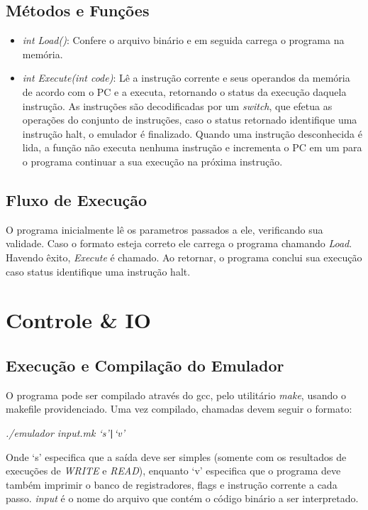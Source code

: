 \documentclass[12pt, a4paper]{article}
\begin{document}
\subsection{Métodos e Funções}

\begin{itemize}
\item \emph{int Load()}: Confere o arquivo binário e em seguida carrega o programa na memória. 
\item \emph{int Execute(int code)}: Lê a instrução corrente e seus operandos da memória de acordo com o PC e a executa, retornando o status da execução daquela instrução. As instruções são decodificadas por um \emph{switch}, que efetua as operações do conjunto de instruções, caso o status retornado identifique uma instrução halt, o emulador é finalizado. Quando uma instrução desconhecida é lida, a função não executa nenhuma instrução e incrementa o PC em um para o programa continuar a sua execução na próxima instrução.
\end{itemize}

\subsection{Fluxo de Execução}

O programa inicialmente lê os parametros passados a ele, verificando sua validade. Caso o formato esteja correto ele carrega o programa chamando \emph{Load}. Havendo êxito, \emph{Execute} é chamado. Ao retornar, o programa conclui sua execução caso status identifique uma instrução halt.

\section{Controle \& IO}

\subsection{Execução e Compilação do Emulador}

O programa pode ser compilado através do gcc, pelo utilitário \emph{make}, usando o makefile providenciado. Uma vez compilado, chamadas devem seguir o formato:

\begin{center}
\emph{./emulador input.mk `s'{\tt{|}}`v'}
\end{center}

Onde `s' especifica que a saída deve ser simples (somente com os resultados de execuções de \emph{WRITE} e \emph{READ}), enquanto `v' especifica que o programa deve também imprimir o banco de registradores, flags e instrução corrente a cada passo. \emph{input} é o nome do arquivo que contém o código binário a ser interpretado.
\end{document}
